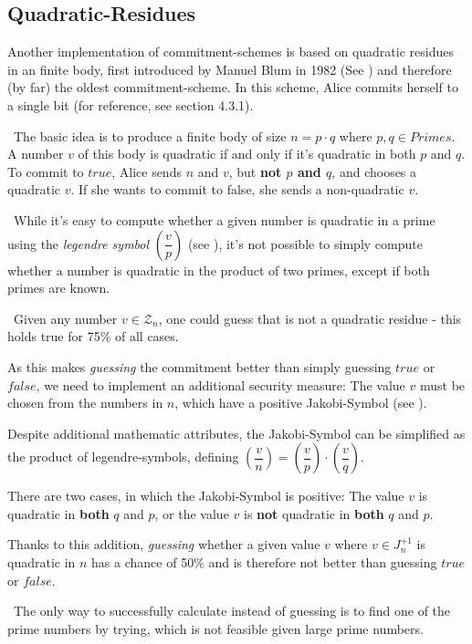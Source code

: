 \subsection{Quadratic-Residues}
Another implementation of commitment-schemes is based on quadratic residues in an finite body, first introduced by Manuel Blum in 1982 (See \cite{Blum82}) and therefore (by far) the oldest commitment-scheme. In this scheme, Alice commits herself to a single bit (for reference, see \cite{DeHa15} section 4.3.1). 

~\newline The basic idea is to produce a finite body of size $n = p \cdot q $ where $p,q \in Primes$. A number $v$ of this body is quadratic if and only if it's quadratic in both $p$ and $q$. To commit to $true$, Alice sends $n$ and $v$, but\textbf{ not $p$ and $q$}, and chooses a quadratic $v$. If she wants to commit to false, she sends a non-quadratic $v$. 

~\newline While it's easy to compute whether a given number is quadratic in a prime using the \textit{legendre symbol} $(\dfrac{v}{p})$ (see \cite{PrGloLeg}), it's not possible to simply compute whether a number is quadratic in the product of two primes, except if both primes are known. 

~\newline Given any number $v \in \mathcal{Z}_n$, one could guess that is not a quadratic residue - this holds true for 75\% of all cases. 

As this makes \textit{guessing} the commitment better than simply guessing $true$ or $false$, we need to implement an additional security measure: The value $v$ must be chosen from the numbers in $n$, which have a positive Jakobi-Symbol (see \cite{PrGloJak}). 

Despite additional mathematic attributes, the Jakobi-Symbol can be simplified as the product of legendre-symbols, defining $(\dfrac{v}{n})= (\dfrac{v}{p})\cdot (\dfrac{v}{q})$.

There are two cases, in which the Jakobi-Symbol is positive: The value $v$ is quadratic in \textbf{both} $q$ and $p$, or the value $v$ is \textbf{not} quadratic in \textbf{both} $q$ and $p$. 

Thanks to this addition, \textit{guessing} whether a given value $v$ where $v \in J_n^{+1}$ is quadratic in $n$ has a chance of 50\% and is therefore not better than guessing $true$ or $false$. 

~\newline The only way to successfully calculate instead of guessing is to find one of the prime numbers by trying, which is not feasible given large prime numbers.

